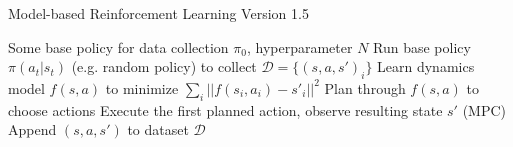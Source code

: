 \begin{algorithm}[t!]
\caption{Model-based Reinforcement Learning Version 1.5}
\begin{algorithmic}[1]
\label{alg:mb15}
\REQUIRE Some base policy for data collection $\pi_0$, hyperparameter $N$
\STATE Run base policy $\pi(a_t|s_t)$ (e.g. random policy) to collect $\mathcal{D} = \{(s,a,s')_i\}$
\STATE Learn dynamics model $f(s,a)$ to minimize $\sum_i\lvert|f(s_i,a_i)-s'_i|\rvert^2$
\STATE Plan through $f(s,a)$ to choose actions
\STATE Execute the first planned action, observe resulting state $s'$ (MPC)
\STATE Append $(s,a,s')$ to dataset $\mathcal{D}$
\ENDWHILE
\ENDFOR
\end{algorithmic}
\end{algorithm}